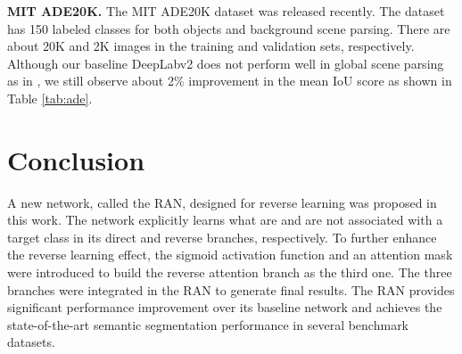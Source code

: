 \documentclass[runningheads]{llncs}
\begin{document}
{\bf MIT ADE20K.} The MIT ADE20K dataset \cite{zhou2016semantic} was
released recently. The dataset has 150 labeled classes for both objects
and background scene parsing. There are about 20K and 2K images in the
training and validation sets, respectively. Although our baseline DeepLabv2 does not perform well in global
scene parsing as in 
\cite{hu2016recalling, zhao2016pyramid}, we still observe about 2\% improvement in the
mean IoU score as shown in Table \ref{tab:ade}. 

\begin{table}[h]
\centering
{}
\caption{Comparison of the mean IoU scores ($\%$) of several benchmarking
methods on the ADE20K dataset.}\label{tab:ade}
\end{table}


\section{Conclusion}

A new network, called the RAN, designed for reverse learning was
proposed in this work.  The network explicitly learns what are and are
not associated with a target class in its direct and reverse branches,
respectively.  To further enhance the reverse learning effect, the
sigmoid activation function and an attention mask were introduced to
build the reverse attention branch as the third one.  The three branches
were integrated in the RAN to generate final results.  The RAN provides
significant performance improvement over its baseline network and
achieves the state-of-the-art semantic segmentation performance in
several benchmark datasets. 




\end{document}

